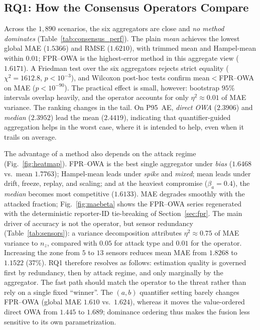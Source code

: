 \documentclass[smartcities,article,submit,moreauthors]{Definitions/mdpi}
\begin{document}


\subsection{RQ1: How the Consensus Operators Compare}
\label{sec:results_rq1}

Across the $1{,}890$ scenarios, the six aggregators are close and
\emph{no method dominates} (Table~\ref{tab:consensus_perf}). The plain
\emph{mean} achieves the lowest global MAE ($1.5366$) and RMSE
($1.6210$), with trimmed mean and Hampel-mean within $0.01$; FPR--OWA is
the highest-error method in this aggregate view ($1.6171$). A Friedman
test over the six aggregators rejects strict equality ($\chi^2=1612.8$,
$p<10^{-3}$), and Wilcoxon post-hoc tests confirm mean$<$FPR--OWA on MAE
($p<10^{-90}$). The practical effect is small, however: bootstrap
$95\%$ intervals overlap heavily, and the operator accounts for only
$\eta^2\approx0.01$ of MAE variance. The ranking changes in the tail. On
P95~AE, \emph{direct OWA} ($2.3906$) and \emph{median} ($2.3952$) lead
the mean ($2.4419$), indicating that quantifier-guided aggregation helps
in the worst case, where it is intended to help, even when it trails on
average.



The advantage of a method also depends on the attack regime
(Fig.~\ref{fig:heatmap}). FPR--OWA is the best single aggregator under
\emph{bias} ($1.6468$ vs.\ mean $1.7763$); Hampel-mean leads under
\emph{spike} and \emph{mixed}; mean leads under drift, freeze, replay,
and scaling; and at the heaviest compromise ($\beta_a=0.4$), the
\emph{median} becomes most competitive ($1.6133$). MAE degrades smoothly
with the attacked fraction; Fig.~\ref{fig:maebeta} shows the FPR--OWA series regenerated
with the deterministic reporter-ID tie-breaking of Section~\ref{sec:fpr}.
The main driver of accuracy is not the operator, but sensor redundancy
(Table~\ref{tab:sensors}): a variance decomposition attributes
$\eta^2\approx0.75$ of MAE variance to $n_z$, compared with $0.05$ for
attack type and $0.01$ for the operator. Increasing the zone from $5$ to
$13$ sensors reduces mean MAE from $1.8268$ to $1.1522$ ($37\%$). RQ1
therefore resolves as follows: estimation quality is governed first by
redundancy, then by attack regime, and only marginally by the aggregator.
The fast path should match the operator to the threat rather than rely on
a single fixed ``winner''. The $(a,b)$ quantifier setting barely changes
FPR--OWA (global MAE $1.610$ vs.\ $1.624$), whereas it moves the
value-ordered direct OWA from $1.445$ to $1.689$; dominance ordering thus
makes the fusion less sensitive to its own parametrization.
\end{document}
